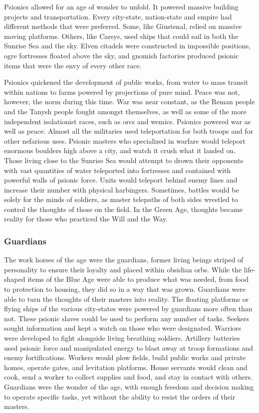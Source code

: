 Psionics allowed for an age of wonder to unfold. It powered massive building projects and transportation. Every city-state, nation-state and empire had different methods that were preferred. Some, like Giustenal, relied on massive moving platforms. Others, like Carsys, used ships that could sail in both the Sunrise Sea and the sky. Elven citadels were constructed in impossible positions, ogre fortresses floated above the sky, and gnomish factories produced psionic items that were the envy of every other race.

Psionics quickened the development of public works, from water to mass transit within nations to farms powered by projections of pure mind. Peace was not, however, the norm during this time. War was near constant, as the Reman people and the Tanysh people fought amongst themselves, as well as some of the more independent isolationist races, such as orcs and wemics. Psionics powered war as well as peace. Almost all the militaries used teleportation for both troops and for other nefarious uses. Psionic masters who specialized in warfare would teleport enormous boulders high above a city, and watch it crush what it landed on. Those living close to the Sunrise Sea would attempt to drown their opponents with vast quantities of water teleported into fortresses and contained with powerful walls of psionic force. Units would teleport behind enemy lines and increase their number with physical harbingers. Sometimes, battles would be solely for the minds of soldiers, as master telepaths of both sides wrestled to control the thoughts of those on the field. In the Green Age, thoughts became reality for those who practiced the Will and the Way.

\subsubsection{Guardians}
The work horses of the age were the guardians, former living beings striped of personality to ensure their loyalty and placed within obsidian orbs. While the life-shaped items of the Blue Age were able to produce what was needed, from food to protection to housing, they did so in a way that was grown. Guardians were able to turn the thoughts of their masters into reality. The floating platforms or flying ships of the various city-states were powered by guardians more often than not. These psionic slaves could be used to perform any number of tasks. Seekers sought information and kept a watch on those who were designated. Warriors were developed to fight alongside living breathing soldiers. Artillery batteries used psionic force and manipulated energy to blast away at troop formations and enemy fortifications. Workers would plow fields, build public works and private homes, operate gates, and levitation platforms. House servants would clean and cook, send a worker to collect supplies and food, and stay in contact with others. Guardians were the wonder of the age, with enough freedom and decision making to operate specific tasks, yet without the ability to resist the orders of their masters.

